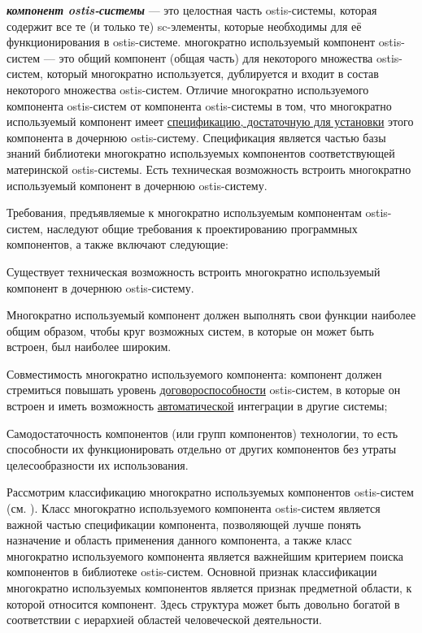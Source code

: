 \textit{\textbf{компонент ostis-системы}} --- это целостная часть ostis-системы, которая содержит все те (и только те) sc-элементы, которые необходимы для её функционирования в ostis-системе. многократно используемый компонент ostis-систем --- это общий компонент (общая часть) для некоторого множества ostis-систем, который многократно используется, дублируется и входит в состав некоторого множества ostis-систем.
Отличие многократно используемого компонента ostis-систем от компонента ostis-системы в том, что многократно используемый компонент имеет \underline{спецификацию, достаточную для установки} этого компонента в дочернюю ostis-систему. Спецификация является частью базы знаний библиотеки многократно используемых компонентов соответствующей материнской ostis-системы. Есть техническая возможность встроить многократно используемый компонент в дочернюю ostis-систему.

Требования, предъявляемые к многократно используемым компонентам ostis-систем, наследуют общие требования к проектированию программных компонентов, а также включают следующие:
\begin{textitemize}
	\item Существует техническая возможность встроить многократно используемый компонент в дочернюю ostis-систему.
	\item Многократно используемый компонент должен выполнять свои функции наиболее общим образом, чтобы круг возможных систем, в которые он может быть встроен, был наиболее широким.
	\item Совместимость многократно используемого компонента: компонент должен стремиться повышать уровень \underline{договороспособности} ostis-систем, в которые он встроен и иметь возможность \underline{автоматической} интеграции в другие системы;
	\item Самодостаточность компонентов (или групп компонентов) технологии, то есть способности их функционировать отдельно от других компонентов без утраты целесообразности их использования.
\end{textitemize}

Рассмотрим классификацию многократно используемых компонентов ostis-систем (см. ). Класс многократно используемого компонента ostis-систем является важной частью спецификации компонента, позволяющей лучше понять назначение и область применения данного компонента, а также класс многократно используемого компонента является важнейшим критерием поиска компонентов в библиотеке ostis-систем. Основной признак классификации многократно используемых компонентов является признак предметной области, к которой относится компонент. Здесь структура может быть довольно богатой в соответствии с иерархией областей человеческой деятельности.

